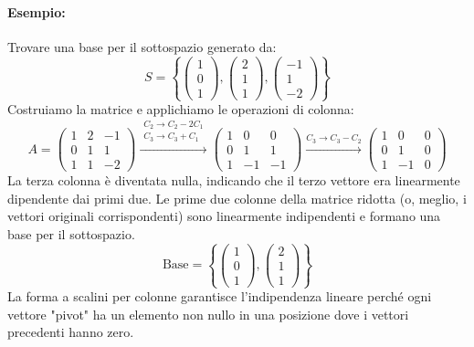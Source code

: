 \documentclass{article}
\begin{document}
\paragraph{Esempio:} Trovare una base per il sottospazio generato da:
\[ S = \left\{ \begin{pmatrix} 1 \\ 0 \\ 1 \end{pmatrix}, \begin{pmatrix} 2 \\ 1 \\ 1 \end{pmatrix}, \begin{pmatrix} -1 \\ 1 \\ -2 \end{pmatrix} \right\} \]
Costruiamo la matrice e applichiamo le operazioni di colonna:
\[
A = \begin{pmatrix}
1 & 2 & -1 \\
0 & 1 & 1 \\
1 & 1 & -2
\end{pmatrix}
\xrightarrow{\substack{C_2 \to C_2 - 2C_1 \\ C_3 \to C_3 + C_1}}
\begin{pmatrix}
1 & 0 & 0 \\
0 & 1 & 1 \\
1 & -1 & -1
\end{pmatrix}
\xrightarrow{C_3 \to C_3 - C_2}
\begin{pmatrix}
1 & 0 & 0 \\
0 & 1 & 0 \\
1 & -1 & 0
\end{pmatrix}
\]
La terza colonna è diventata nulla, indicando che il terzo vettore era linearmente dipendente dai primi due.
Le prime due colonne della matrice ridotta (o, meglio, i vettori originali corrispondenti) sono linearmente indipendenti e formano una base per il sottospazio.
\[ \text{Base} = \left\{ \begin{pmatrix} 1 \\ 0 \\ 1 \end{pmatrix}, \begin{pmatrix} 2 \\ 1 \\ 1 \end{pmatrix} \right\} \]
La forma a scalini per colonne garantisce l'indipendenza lineare perché ogni vettore "pivot" ha un elemento non nullo in una posizione dove i vettori precedenti hanno zero.
\end{document}
